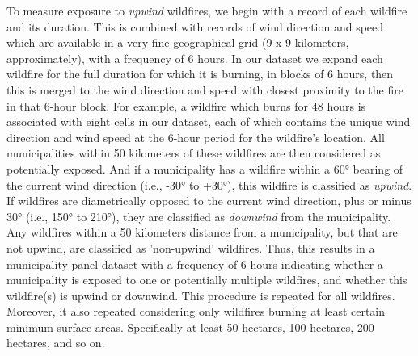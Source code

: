 \documentclass[11pt]{article}
\begin{document}
\begin{spacing}{1.3}
To measure exposure to \textit{upwind} wildfires, we begin with a record of each wildfire and its duration.  This is combined with records of wind direction and speed which are available in a very fine geographical grid (9 x 9 kilometers, approximately), with a frequency of 6 hours. In our dataset we expand each wildfire for the full duration for which it is burning, in blocks of 6 hours, then this is merged to the wind direction and speed with closest proximity to the fire in that 6-hour block.  For example, a wildfire which burns for 48 hours is associated with eight cells in our dataset, each of which contains the unique wind direction and wind speed at the 6-hour period for the wildfire's location.  All municipalities within 50 kilometers of these wildfires are then considered as potentially exposed. And if a municipality has a wildfire within a 60° bearing of the current wind direction (i.e., -30° to +30°), this wildfire is classified as \textit{upwind}.  If wildfires are diametrically opposed to the current wind direction, plus or minus 30° (i.e., 150° to 210°), they are classified as \textit{downwind} from the municipality.  Any wildfires within a 50 kilometers distance from a municipality,  but that are not upwind, are classified as 'non-upwind' wildfires.  Thus, this results in a municipality panel dataset with a frequency of 6 hours indicating whether a municipality is exposed to one or potentially multiple wildfires, and whether this wildfire(s) is upwind or downwind.  This procedure is repeated for all wildfires. Moreover, it also repeated considering only wildfires burning at least certain minimum surface areas. Specifically at least 50 hectares, 100 hectares, 200 hectares, and so on.


\end{spacing}
\end{document}
